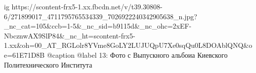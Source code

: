  
 
 
 
 

\ifcmt
  ig https://scontent-frx5-1.xx.fbcdn.net/v/t39.30808-6/271899017_4711795765534339_7026922240342905638_n.jpg?_nc_cat=105&ccb=1-5&_nc_sid=b9115d&_nc_ohc=2xEF-NbcznwAX9SlP84&_nc_ht=scontent-frx5-1.xx&oh=00_AT_RGLolr8YVme8GoLY2LUJUQpU7Xe0sqQu0L8DOAblQNQ&oe=61E71D8B
  @caption @label 13: Фото с Выпускного альбоиа Киевского Политехнического Института
\fi
